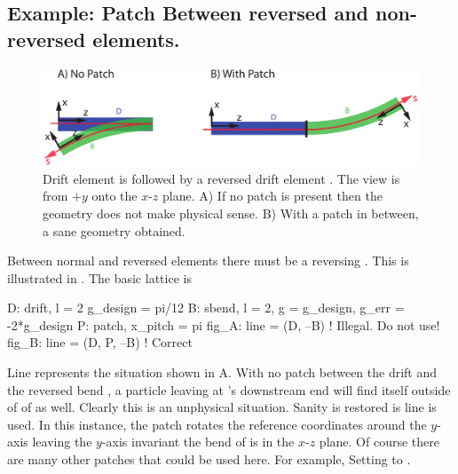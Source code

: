 
\subsection{Example: Patch Between reversed and non-reversed elements.}
\label{s:ex.patch}

\begin{figure}[tb]
  \centering
  \includegraphics[width=5in]{patch-between.pdf}
  \caption[Patching between reversed and non-reversed elements.]{
Drift element  is followed by a reversed drift element .
The view is from $+y$ onto the $x$-$z$ plane. A) If no patch is
present then the geometry does not make physical sense. B) With a
patch in between, a sane geometry obtained.}
  \label{f:patch.between}
\end{figure}

Between normal and reversed elements there must be a reversing . 
This is illustrated in . The basic lattice is
\begin{example}
  D: drift, l = 2
  g_design = pi/12
  B: sbend, l = 2, g = g_design, g_err = -2*g_design
  P: patch, x_pitch = pi
  fig_A: line = (D, --B)     ! Illegal. Do not use!
  fig_B: line = (D, P, --B)  ! Correct
\end{example}
Line  represents the situation shown in
A.  With no patch between the drift  and
the reversed bend , a particle leaving  at 's
downstream end will find itself outside of of  as well. Clearly
this is an unphysical situation. Sanity is restored is line 
is used. In this instance, the patch  rotates the reference
coordinates around the $y$-axis leaving the $y$-axis invariant the
bend of  is in the $x$-$z$ plane. Of course there are many other
patches that could be used here. For example, Setting  to
. 

